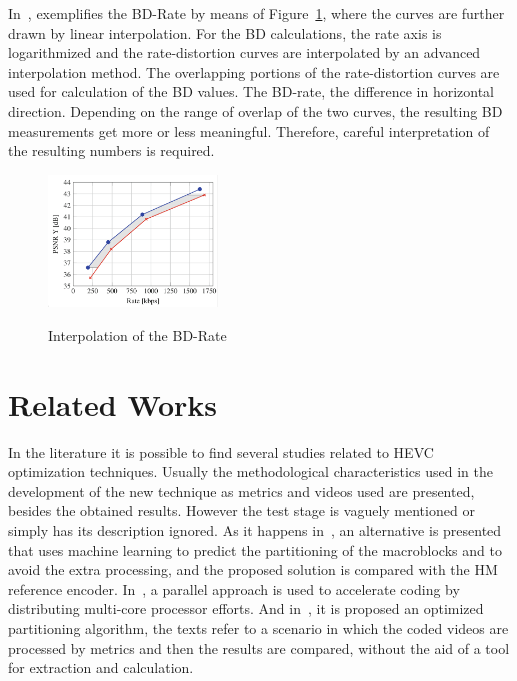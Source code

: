 \documentclass{acm_proc_article-sp}
\begin{document}
In~\cite{Mathias}, exemplifies the BD-Rate by means of Figure~\ref{fig:chart_barate}, where the curves are further drawn by linear interpolation. For the BD calculations, the rate axis is logarithmized and the rate-distortion curves are interpolated by an advanced interpolation method. The overlapping portions of the rate-distortion curves are used for calculation of the BD values. The BD-rate, the difference in horizontal direction. Depending on the range of overlap of the two curves, the resulting BD measurements get more or less meaningful. Therefore, careful interpretation of the resulting numbers is required.


\FloatBarrier
\begin{figure}[!ht]
	\centering
	\caption{Interpolation of the BD-Rate \cite{Mathias}}
	\includegraphics[width=0.4\textwidth]{figures/chartbdrate.png}
	\label{fig:chart_barate}
\end{figure}
\FloatBarrier
	

\section{Related Works}


In the literature it is possible to find several studies related to HEVC optimization techniques. Usually the methodological characteristics used in the development of the new technique as metrics and videos used are presented, besides the obtained results. However the test stage is vaguely mentioned or simply has its description ignored. As it happens in~\cite{oliveira:16}, an alternative is presented that uses machine learning to predict the partitioning of the macroblocks and to avoid the extra processing, and the proposed solution is compared with the HM reference encoder. In~\cite{Wang:16}, a parallel approach is used to accelerate coding by distributing multi-core processor efforts. And in~\cite{wang:13}, it is proposed an optimized partitioning algorithm, the texts refer to a scenario in which the coded videos are processed by metrics and then the results are compared, without the aid of a tool for extraction and calculation.
\end{document}
